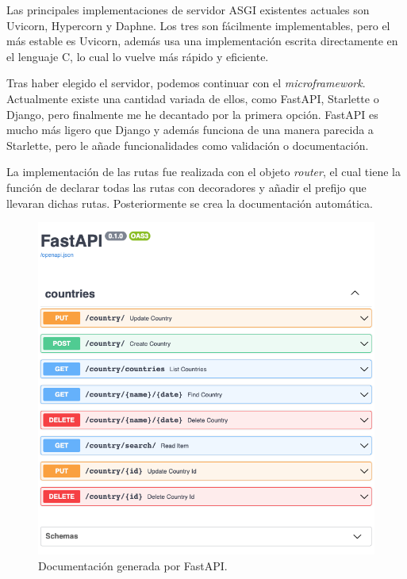 Las principales implementaciones de servidor \ac{ASGI} existentes actuales son Uvicorn, Hypercorn y Daphne. Los tres son fácilmente implementables, pero el más estable es Uvicorn, además usa una implementación escrita directamente en el lenguaje C, lo cual lo vuelve más rápido y eficiente. \cite{uvicorn-manual}

\vspace{0.3cm}

Tras haber elegido el servidor, podemos continuar con el \textit{microframework}. Actualmente existe una cantidad variada de ellos, como FastAPI, Starlette o Django, pero finalmente me he decantado por la primera opción. FastAPI es mucho más ligero que Django y además funciona de una manera parecida a Starlette, pero le añade funcionalidades como validación o documentación. \cite{fastapi-manual}

\vspace{0.3cm}

La implementación de las rutas fue realizada con el objeto \textit{router}, el cual tiene la función de declarar todas las rutas con decoradores y añadir el prefijo que llevaran dichas rutas. Posteriormente se crea la documentación automática.

\vspace{0.3cm}

\begin{figure}[H]
    \centering
    \myfloatalign
    \includegraphics[width=1\textwidth]{gfx/fastapi-rutas.png}
    \caption[Documentación generada por FastAPI]{Documentación generada por FastAPI.}\label{gfx:fastapi-rutas}
\end{figure}

